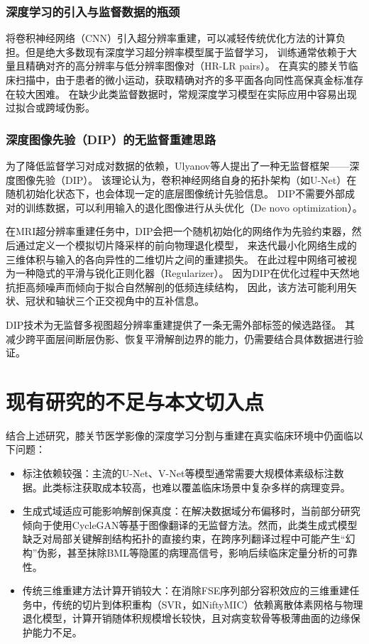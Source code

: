     \subsubsection{深度学习的引入与监督数据的瓶颈}
      将卷积神经网络（CNN）引入超分辨率重建，可以减轻传统优化方法的计算负担。但是绝大多数现有深度学习超分辨率模型属于监督学习，
      训练通常依赖于大量且精确对齐的高分辨率与低分辨率图像对（HR-LR pairs）。
      在真实的膝关节临床扫描中，由于患者的微小运动，获取精确对齐的多平面各向同性高保真金标准存在较大困难。
      在缺少此类监督数据时，常规深度学习模型在实际应用中容易出现过拟合或跨域伪影。
    \subsubsection{深度图像先验（DIP）的无监督重建思路}
      为了降低监督学习对成对数据的依赖，Ulyanov等人提出了一种无监督框架——深度图像先验（DIP）。
      该理论认为，卷积神经网络自身的拓扑架构（如U-Net）在随机初始化状态下，也会体现一定的底层图像统计先验信息。
      DIP不需要外部成对的训练数据，可以利用输入的退化图像进行从头优化（De novo optimization）\cite{ulyanovDeepImagePrior2020}。
      \par 在MRI超分辨率重建任务中，DIP会把一个随机初始化的网络作为先验约束器，然后通过定义一个模拟切片降采样的前向物理退化模型，
      来迭代最小化网络生成的三维体积与输入的各向异性的二维切片之间的重建损失。
      在此过程中网络可被视为一种隐式的平滑与锐化正则化器（Regularizer）。
      因为DIP在优化过程中天然地抗拒高频噪声而倾向于拟合自然解剖的低频连续结构，
      因此，该方法可能利用矢状、冠状和轴状三个正交视角中的互补信息。
      \par DIP技术为无监督多视图超分辨率重建提供了一条无需外部标签的候选路径。
      其减少跨平面层间断层伪影、恢复平滑解剖边界的能力，仍需要结合具体数据进行验证。

\section{现有研究的不足与本文切入点}
  结合上述研究，膝关节医学影像的深度学习分割与重建在真实临床环境中仍面临以下问题：
  \begin{itemize}
    \item 标注依赖较强：主流的U-Net、V-Net等模型通常需要大规模体素级标注数据。此类标注获取成本较高，也难以覆盖临床场景中复杂多样的病理变异。
    \item 生成式域适应可能影响解剖保真度：在解决数据域分布偏移时，当前部分研究倾向于使用CycleGAN等基于图像翻译的无监督方法。然而，此类生成式模型缺乏对局部关键解剖结构拓扑的直接约束，在跨序列翻译过程中可能产生“幻构”伪影，甚至抹除BML等隐匿的病理高信号，影响后续临床定量分析的可靠性。
    \item 传统三维重建方法计算开销较大：在消除FSE序列部分容积效应的三维重建任务中，传统的切片到体积重构（SVR，如NiftyMIC）依赖离散体素网格与物理退化模型，计算开销随体积规模增长较快，且对病变软骨等极薄曲面的边缘保护能力不足。
  \end{itemize}
